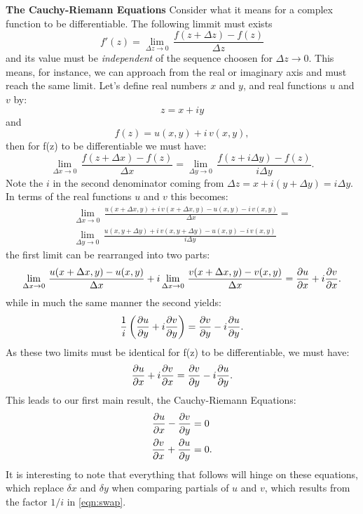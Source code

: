 \documentclass[12pt]{article}
\begin{document}
\vskip 0.5cm
\noindent
{\bf The Cauchy-Riemann Equations}
\vskip 0.5cm
\noindent
Consider what it means for a complex function to be differentiable.  The
following limmit must exists
\begin{displaymath}
f'(z) = \lim_{\Delta z \to 0} \, \frac{f(z+\Delta z) - f(z)}{\Delta z}
\end{displaymath}
and its value must be {\it independent} of the sequence choosen for $\Delta z
\to 0$.  This means, for instance, we can approach from the real or imaginary
axis and must reach the same limit.  Let's define real numbers $x$ and $y$, and
real functions $u$ and $v$ by:
\begin{equation}
z = x + iy
\end{equation}
and
\begin{equation}
f(z) = u(x,y) + i\,v(x,y),
\end{equation}
then for f(z) to be differentiable we must have:
\begin{displaymath}
\lim_{\Delta x \to 0} \, \frac{f(z+\Delta x)-f(z)}{\Delta x} =
\lim_{\Delta y \to 0} \, \frac{f(z+i\Delta y)-f(z)}{i\Delta y}.
\end{displaymath}
Note the $i$ in the second denominator coming from $\Delta z = x + i(y + \Delta y) = i \Delta y$.  In terms of the real functions $u$ and $v$ this becomes:
\begin{displaymath}
\begin{split}
\lim_{\Delta x \to 0} \, \frac{u(x+\Delta x,y)+i \,v(x+\Delta x,y)-u(x,y)-i\,v(x,y)}{\Delta x} = \\
\lim_{\Delta y \to 0} \, \frac{u(x,y+\Delta y)+i \,v(x,y+\Delta y)-u(x,y)-i\,v(x,y)}
{i \Delta y} 
\end{split}
\end{displaymath}
the first limit can be rearranged into two parts:
\begin{displaymath}
\lim_{\Delta x \to 0} \, \frac{u(x+\Delta x,y)-u(x,y)}{\Delta x} 
+ i\lim_{\Delta x \to 0} \, \frac{v(x+\Delta x,y)-v(x,y)}{\Delta x} = 
\frac{\partial u}{\partial x}+i\frac{\partial v}{\partial x}.
\end{displaymath}
while in much the same manner the second yields:
\begin{equation} \label{eqn:swap}
\frac{1}{i}
\left( \frac{\partial u}{\partial y}+i\frac{\partial v}{\partial y} \right)
= \frac{\partial v}{\partial y}-i\frac{\partial u}{\partial y}.
\end{equation}
As these two limits must be identical for f(z) to be differentiable, we must have:
\begin{displaymath}
\frac{\partial u}{\partial x}+i\frac{\partial v}{\partial x}
= \frac{\partial v}{\partial y}-i\frac{\partial u}{\partial y}.
\end{displaymath}
This leads to our first main result, the Cauchy-Riemann Equations:
\begin{equation} \label{eqn:cauchyriemann}
\begin{split}
\frac{\partial u}{\partial x} - \frac{\partial v}{\partial y} & = 0\\
\frac{\partial v}{\partial x} + \frac{\partial u}{\partial y} & = 0.
\end{split}
\end{equation}
It is interesting to note that everything that follows will hinge on these
equations, which replace $\delta x$ and $\delta y$ when comparing partials of
$u$ and $v$, which results from the factor $1/i$ in \eqref{eqn:swap}.
\end{document}
